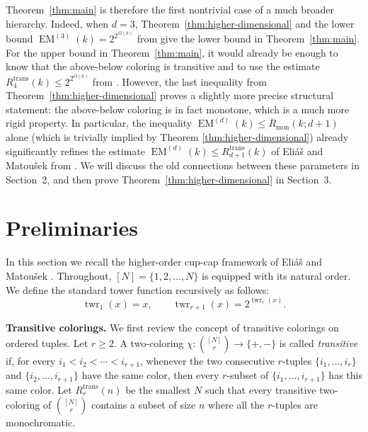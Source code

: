 \documentclass[11pt]{article}
\newcommand{\twr}{\operatorname{twr}}
\begin{document}
Theorem~\ref{thm:main} is therefore the first nontrivial case of a much broader hierarchy. Indeed, when $d=3$, Theorem~\ref{thm:higher-dimensional} and the lower bound $\operatorname{EM}^{(3)}(k)=2^{2^{\Omega(k)}}$ from
\cite[Theorem 1.5]{EM} give the lower bound in Theorem~\ref{thm:main}. For the upper bound in Theorem~\ref{thm:main}, it would already be enough to know that the above-below coloring is transitive and to use the estimate $R^{\mathrm{trans}}_4(k)\le 2^{2^{O(k)}}$ from \cite[Theorem 1.4]{EM}. However, the last inequality from Theorem~\ref{thm:higher-dimensional} proves a slightly more precise structural statement: the above-below coloring is in fact monotone, which is a much more rigid property. In particular, the inequality $\operatorname{EM}^{(d)}(k) \le \overline R_{\mathrm{mon}}(k;d+1)$ alone (which is trivially implied by Theorem \ref{thm:higher-dimensional}) already significantly refines the estimate $\operatorname{EM}^{(d)}(k)\le R_{d+1}^{\mathrm{trans}}(k)$ of Eli\'a\v{s} and Matou\v{s}ek from \cite{EM}. We will discuss the old connections between these parameters in Section~2, and then prove Theorem~\ref{thm:higher-dimensional} in Section~3. 



\section{Preliminaries}

In this section we recall the higher-order cup-cap framework of Eli\'a\v{s} and Matou\v{s}ek \cite{EM}. Throughout, $[N]=\{1,2,\dots,N\}$ is equipped with its natural order. We define the standard tower function recursively as follows:
\[
\twr_1(x)=x,
\qquad
\twr_{r+1}(x)=2^{\twr_r(x)}.
\]

\smallskip

\noindent\textbf{Transitive colorings.} We first review the concept of transitive colorings on ordered tuples. Let $r\ge 2$. A two-coloring $\chi:\binom{[N]}{r}\to\{+,-\}$
is called \emph{transitive} if, for every $i_1<i_2<\cdots<i_{r+1}$, whenever the two consecutive $r$-tuples $\{i_1,\dots,i_r\}$ and $\{i_2,\dots,i_{r+1}\}$ have the same color, then every $r$-subset of $\{i_1,\dots,i_{r+1}\}$ has this same color. Let $R_r^{\mathrm{trans}}(n)$ be the smallest $N$ such that every transitive two-coloring of $\binom{[N]}r$ contains a subset of size $n$ where all the $r$-tuples are monochromatic.
\end{document}
